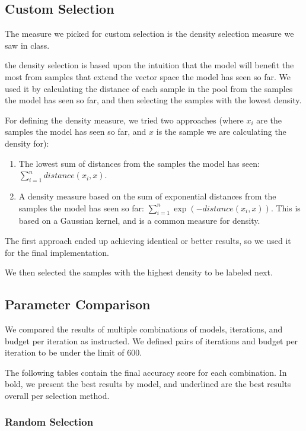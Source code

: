 \documentclass[12pt]{article}
\begin{document}
\subsection{Custom Selection}

The measure we picked for custom selection is the density selection measure we saw in class.

the density selection is based upon the intuition that the model will benefit the most from samples that extend the vector space the model has seen so far. We used it by calculating the distance of each sample in the pool from the samples the model has seen so far, and then selecting the samples with the lowest density.

For defining the density measure, we tried two approaches (where $x_i$ are the samples the model has seen so far, and $x$ is the sample we are calculating the density for):

\begin{enumerate}
    \item The lowest sum of distances from the samples the model has seen: $ \sum_{i=1}^{n} distance(x_i, x) $.
    \item A density measure based on the sum of exponential distances from the samples the model has seen so far: $ \sum_{i=1}^{n} \exp(-distance(x_i, x)) $.
    This is based on a Gaussian kernel, and is a common measure for density.
\end{enumerate}
The first approach ended up achieving identical or better results, so we used it for the final implementation.

We then selected the samples with the highest density to be labeled next.

\subsection{Parameter Comparison}

We compared the results of multiple combinations of models, iterations, and budget per iteration as instructed. We defined pairs of iterations and budget per iteration to be under the limit of 600.

The following tables contain the final accuracy score for each combination. In bold, we present the best results by model, and underlined are the best results overall per selection method.

\subsubsection*{Random Selection}
\end{document}
